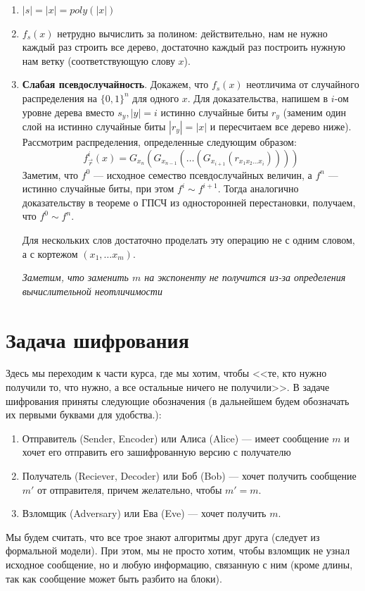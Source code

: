 \begin{enumerate}
    \item \(|s| = |x| = poly(|x|)\)
    \item \(f_s(x)\) нетрудно вычислить за полином: действительно, нам не нужно каждый раз строить все дерево, достаточно каждый раз построить нужную нам ветку (соответствующую слову \(x\)).
    \item \textbf{Слабая псевдослучайность}. Докажем, что \(f_s(x)\) неотличима от случайного распределения на \(\{0, 1\}^n\) для одного \(x\). Для доказательства, напишем в \(i\)-ом уровне дерева вместо \(s_y, |y| = i\) истинно случайные биты \(r_y\) (заменим один слой на истинно случайные биты \(|r_y| = |x|\) и пересчитаем все дерево ниже). Рассмотрим распределения, определенные следующим образом:
    \[f_{\vec{r}}^i(x) = G_{x_n}(G_{x_{n - 1}}(\dots (G_{x_{i + 1}}(r_{x_1x_2\dots x_i}))))\]
    Заметим, что \(f^0\) --- исходное семество псевдослучайных величин, а \(f^n\) --- истинно случайные биты, при этом \(f^i \sim f^{i + 1}\). Тогда аналогично доказательству в теореме о ГПСЧ из односторонней перестановки, получаем, что \(f^0 \sim f^n\).

    Для нескольких слов достаточно проделать эту операцию не с одним словом, а с кортежом \((x_1, \dots x_m)\). 

    \textit{Заметим, что заменить \(m\) на экспоненту не получится из-за определения вычислительной неотличимости}
\end{enumerate}

\section{Задача шифрования}

Здесь мы переходим к части курса, где мы хотим, чтобы <<те, кто нужно получили то, что нужно, а все остальные ничего не получили>>. В задаче шифрования приняты следующие обозначения (в дальнейшем будем обозначать их первыми буквами для удобства.):
\begin{enumerate}
    \item Отправитель (Sender, Encoder) или Алиса (Alice) --- имеет сообщение \(m\) и хочет его отправить его зашифрованную версию \(с\) получателю
    \item Получатель (Reciever, Decoder) или Боб (Bob) --- хочет получить сообщение \(m'\) от отправителя, причем желательно, чтобы \(m' = m\).
    \item Взломщик (Adversary) или Ева (Eve) --- хочет получить \(m\).
\end{enumerate}
Мы будем считать, что все трое знают алгоритмы друг друга (следует из формальной модели). При этом, мы не просто хотим, чтобы взломщик не узнал исходное сообщение, но и любую информацию, связанную с ним (кроме длины, так как сообщение может быть разбито на блоки).

